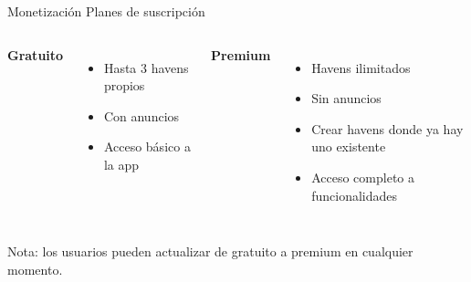 \begin{frame}{Monetización}
    \centering
    {\Large\color{BrownDeep} Planes de suscripción}

    \vspace{0.8cm}

    \begin{columns}[T,onlytextwidth]
        \centering
        \textbf{Gratuito} \\
        \vspace{0.3cm}
        {\color{BrownText}
        \begin{itemize}
            \item Hasta 3 havens propios
            \item Con anuncios
            \item Acceso básico a la app
        \end{itemize}
        }

        \centering
        \textbf{Premium} \\
        \vspace{0.3cm}
        {\color{BrownText}
        \begin{itemize}
            \item Havens ilimitados
            \item Sin anuncios
            \item Crear havens donde ya hay uno existente
            \item Acceso completo a funcionalidades
        \end{itemize}
        }
    \end{columns}

    \vspace{0.2cm}
    {\small\color{BrownAccent} Nota: los usuarios pueden actualizar de gratuito a premium en cualquier momento.}
\end{frame}
